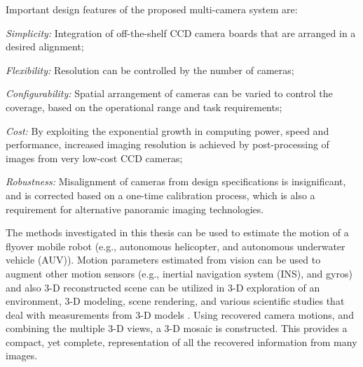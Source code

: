 
Important design features of the proposed multi-camera system are:

\bi
    \item \textit{Simplicity:} Integration of off-the-shelf CCD camera boards that are arranged in a desired alignment;
    \item \textit{Flexibility:} Resolution can be controlled by the number of cameras;
    \item \textit{Configurability:} Spatial arrangement of cameras can be varied to control the coverage, based on the operational range and task requirements;
    \item \textit{Cost:} By exploiting the exponential growth in computing power, speed and performance, increased imaging resolution is achieved by post-processing of images from very low-cost CCD cameras;
    \item \textit{Robustness:} Misalignment of cameras from design specifications is insignificant, and is corrected based on a one-time calibration process, which is also a requirement for alternative panoramic imaging
    technologies.
\ei



The methods investigated in this thesis can be used to estimate the motion of a flyover mobile
robot (e.g., autonomous helicopter, and autonomous underwater vehicle (AUV)). Motion parameters
estimated from vision can be used to augment other motion sensors (e.g., inertial navigation system
(INS), and gyros) and also 3-D reconstructed scene can be utilized in 3-D exploration of an
environment, 3-D modeling, scene rendering, and various scientific studies that deal with
measurements from 3-D models \cite{kha99, neg98p}. Using recovered camera motions, and combining
the multiple 3-D views, a 3-D mosaic is constructed. This provides a compact, yet complete,
representation of all the recovered information from many images.

